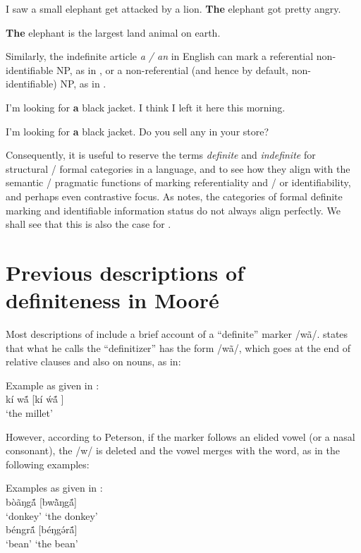 \documentclass[output=paper]{langsci/langscibook}
\begin{document}
\ea\label{ex:teo:6}
I saw a small elephant get attacked by a lion. \textbf{The} elephant got pretty angry.
\z

\ea\label{ex:teo:7}
\textbf{The} elephant is the largest land animal on earth.
\z

Similarly, the indefinite article \textit{a / an} in English can mark a referential non-identifiable NP, as in , or a non-referential (and hence by default, non-identifiable) NP, as in .

\ea\label{ex:teo:8}
I’m looking for \textbf{a} black jacket. I think I left it here this morning. 
\z

\ea\label{ex:teo:9}
I’m looking for \textbf{a} black jacket. Do you sell any in your store? 
\z

Consequently, it is useful to reserve the terms \textit{definite} and \textit{indefinite} for structural / formal categories in a language, and to see how they align with the semantic / pragmatic functions of marking referentiality and / or identifiability, and perhaps even contrastive focus. As \citet[79]{Lambrecht1994} notes, the categories of formal definite marking and identifiable information status do not always align perfectly. We shall see that this is also the case for .

\section{Previous descriptions of definiteness in Mooré}\label{sec:teo:3}

Most descriptions of  include a brief account of a “definite” marker /wã/. \citet[77]{Peterson1971} states that what he calls the “definitizer” has the form /wã/, which goes at the end of relative clauses and also on nouns, as in:

\ea\label{ex:teo:10}
Example as given in \citet[77]{Peterson1971}:\\
 kí w\'{ã}  [kí \'{w}\'{ã} ]\\
‘the millet’
\z

However, according to Peterson, if the marker follows an elided vowel (or a nasal consonant), the /w/ is deleted and the vowel merges with the word, as in the following examples:

\ea\label{ex:teo:11}
Examples as given in \citet[77]{Peterson1971}:\\
  {bòãŋg\'{ã}  [bw\`{ã}ŋg\'{ã}]} \\
{‘donkey’}  {‘the donkey’} \\
  {béngr\'{ã}  [béŋg\'{ə}r\'{ã}]} \\
‘bean’  {‘the bean’} \\
\z
\end{document}
